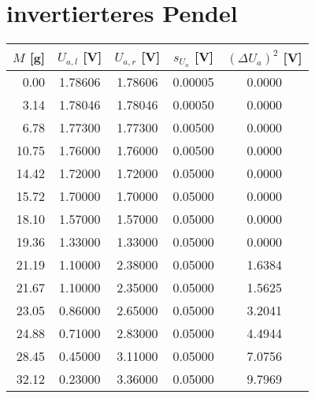 

\section{invertierteres Pendel}

\begin{tabular}{rcccc}
    $M$ [g] &  $U_{a,l}$ [V] &  $U_{a,r}$ [V] &  $s_{U_a}$ [V] &  $(\Delta U_a)^2$ [V] \\
    \hline
     0.00 &  1.78606 &  1.78606 &  0.00005 &   0.0000 \\
     3.14 &  1.78046 &  1.78046 &  0.00050 &   0.0000 \\
     6.78 &  1.77300 &  1.77300 &  0.00500 &   0.0000 \\
    10.75 &  1.76000 &  1.76000 &  0.00500 &   0.0000 \\
    14.42 &  1.72000 &  1.72000 &  0.05000 &   0.0000 \\
    15.72 &  1.70000 &  1.70000 &  0.05000 &   0.0000 \\
    18.10 &  1.57000 &  1.57000 &  0.05000 &   0.0000 \\
    19.36 &  1.33000 &  1.33000 &  0.05000 &   0.0000 \\
    21.19 &  1.10000 &  2.38000 &  0.05000 &   1.6384 \\
    21.67 &  1.10000 &  2.35000 &  0.05000 &   1.5625 \\
    23.05 &  0.86000 &  2.65000 &  0.05000 &   3.2041 \\
    24.88 &  0.71000 &  2.83000 &  0.05000 &   4.4944 \\
    28.45 &  0.45000 &  3.11000 &  0.05000 &   7.0756 \\
    32.12 &  0.23000 &  3.36000 &  0.05000 &   9.7969 \\
\end{tabular}\\